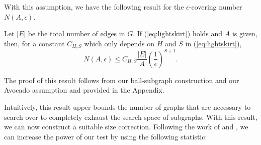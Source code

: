 With this assumption, we have the following result for the $\epsilon$-covering number $N(A,\epsilon)$.
\begin{lemma}
	\label{lm:entropy}
        Let $|E|$ be the total number of edges in $G$. If (\ref{eq:lightskirt}) holds and $A$ is given, 
        then, for a constant $C_{H,S}$ which only depends on $H$ and $S$ in (\ref{eq:lightskirt}),
	{\begin{equation}
	    \label{eq:entropy}
	    N(A,\epsilon)\le C_{H,S}\frac{|E|}{ A}\left(\frac{1}{ \epsilon}\right)^{S+1}.
	\end{equation}}
\end{lemma}
The proof of this result follows from our ball-subgraph construction and our Avocado assumption and provided in the Appendix.

Intuitively, this result upper bounds the number of graphs that are necessary to search over to completely exhaust the search space of subgraphs. With this result, we can now construct a suitable size correction. 
Following the work of \cite{walther2010optimal} and \cite{wang2016structured}, we can increase the power of our test by using the following statistic:
